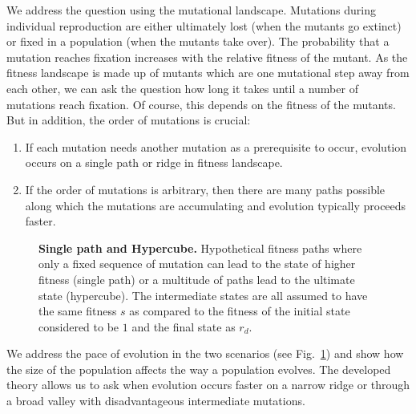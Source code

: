 \documentclass[oneside,11pt,a4paper]{book}
\begin{document}
We address the question using the mutational landscape.
Mutations during individual reproduction are either ultimately lost (when the mutants go extinct) or
fixed in a population (when the mutants take over). The probability that a mutation reaches fixation 
increases with the relative fitness of the mutant. 
As the fitness landscape is made up of mutants which are one mutational step away from each other, we can ask the question how long it takes until a number of mutations reach fixation. 
Of course, this depends on the fitness of the mutants. 
But in addition, the order of mutations is crucial: 
%
\begin{enumerate}
\item If each mutation needs another mutation as a prerequisite to occur, 
evolution occurs on a single path or ridge in fitness landscape. 
\item If the order of mutations is arbitrary, then there are many paths possible along which the mutations are
accumulating and evolution typically proceeds faster. 
\end{enumerate}
%
\begin{figure}[h]
  \begin{center}
    \caption{\textbf{Single path and Hypercube.}
    \small{Hypothetical fitness paths where only a fixed sequence of mutation can lead to the state of higher fitness (single path) or a multitude of paths lead to the ultimate state (hypercube).
The intermediate states are all assumed to have the same fitness $s$ as compared to the fitness of the initial state considered to be $1$ and the final state as $r_d$.}
}
    \label{fig:paperfig}
  \end{center}
\end{figure}
%
We address the pace of evolution in the two scenarios (see Fig.\ \ref{fig:paperfig}) and show how the size of the population affects the way a population evolves. 
The developed theory allows us to ask when evolution occurs faster on a narrow ridge or through a broad valley with disadvantageous intermediate mutations.
\end{document}
